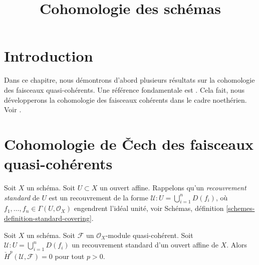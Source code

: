 

%


\title{Cohomologie des schémas}


\maketitle

\label{section-phantom}

\tableofcontents

\section{Introduction}
\label{section-introduction}

\noindent
Dans ce chapitre, nous démontrons d'abord plusieurs résultats sur la cohomologie des
faisceaux quasi-cohérents. Une référence fondamentale est \cite{EGA}.
Cela fait, nous développerons la cohomologie des
faisceaux cohérents dans le cadre noethérien. Voir \cite{FAC}.







\section{Cohomologie de {\v C}ech des faisceaux quasi-cohérents}
\label{section-cech-quasi-coherent}

\noindent
Soit $X$ un schéma.
Soit $U \subset X$ un ouvert affine.
Rappelons qu'un {\it recouvrement standard} de $U$ est un recouvrement
de la forme $\mathcal{U} : U = \bigcup_{i = 1}^n D(f_i)$,
où $f_1, \ldots, f_n \in \Gamma(U, \mathcal{O}_X)$ engendrent
l'idéal unité, voir
Schémas, définition \ref{schemes-definition-standard-covering}.

\begin{lemma}
\label{lemma-cech-cohomology-quasi-coherent-trivial}
Soit $X$ un schéma.
Soit $\mathcal{F}$ un $\mathcal{O}_X$-module quasi-cohérent.
Soit $\mathcal{U} : U = \bigcup_{i = 1}^n D(f_i)$ un recouvrement
standard d'un ouvert affine de $X$.
Alors $\check{H}^p(\mathcal{U}, \mathcal{F}) = 0$ pour
tout $p > 0$.
\end{lemma}

